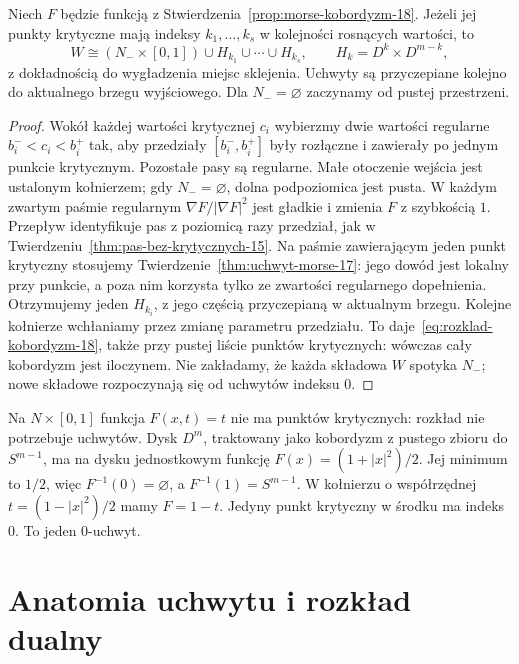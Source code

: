 \begin{twierdzenie}
\label{thm:rozklad-uchwyty-18}
Niech $F$ będzie funkcją z
Stwierdzenia~\ref{prop:morse-kobordyzm-18}.
Jeżeli jej punkty krytyczne mają indeksy
$k_1,\ldots,k_s$ w kolejności rosnących
wartości, to
\begin{equation}\label{eq:rozklad-kobordyzm-18}
 W\cong
 (N_-\times[0,1])\cup H_{k_1}\cup\cdots\cup H_{k_s},
 \qquad H_k=D^k\times D^{m-k},
\end{equation}
z dokładnością do wygładzenia miejsc sklejenia.
Uchwyty są przyczepiane kolejno do aktualnego
brzegu wyjściowego. Dla $N_-=\varnothing$
zaczynamy od pustej przestrzeni.
\end{twierdzenie}
\begin{proof}
Wokół każdej wartości krytycznej $c_i$ wybierzmy
dwie wartości regularne $b_i^-<c_i<b_i^+$ tak, aby
przedziały $[b_i^-,b_i^+]$ były rozłączne i zawierały
po jednym punkcie krytycznym. Pozostałe pasy są regularne.
Małe otoczenie wejścia jest ustalonym kołnierzem;
gdy $N_-=\varnothing$, dolna podpoziomica jest pusta.
W każdym zwartym paśmie regularnym
$\nabla F/|\nabla F|^2$ jest gładkie i zmienia $F$
z szybkością $1$. Przepływ identyfikuje pas
z poziomicą razy przedział, jak w
Twierdzeniu~\ref{thm:pas-bez-krytycznych-15}.
Na paśmie zawierającym jeden punkt krytyczny
stosujemy Twierdzenie~\ref{thm:uchwyt-morse-17}:
jego dowód jest lokalny przy punkcie, a poza nim
korzysta tylko ze zwartości regularnego dopełnienia.
Otrzymujemy jeden $H_{k_i}$, z jego częścią przyczepianą
w aktualnym brzegu. Kolejne kołnierze wchłaniamy
przez zmianę parametru przedziału.
To daje~\eqref{eq:rozklad-kobordyzm-18}, także przy
pustej liście punktów krytycznych: wówczas cały
kobordyzm jest iloczynem. Nie zakładamy, że każda
składowa $W$ spotyka $N_-$; nowe składowe rozpoczynają
się od uchwytów indeksu $0$.
\end{proof}

\begin{przyklad}
Na $N\times[0,1]$ funkcja $F(x,t)=t$
nie ma punktów krytycznych: rozkład nie
potrzebuje uchwytów. Dysk $D^m$, traktowany
jako kobordyzm z pustego zbioru do
$S^{m-1}$, ma na dysku jednostkowym funkcję
$F(x)=(1+|x|^2)/2$. Jej minimum to $1/2$,
więc $F^{-1}(0)=\varnothing$, a $F^{-1}(1)=S^{m-1}$.
W kołnierzu o współrzędnej $t=(1-|x|^2)/2$
mamy $F=1-t$. Jedyny punkt krytyczny w środku
ma indeks $0$.
To jeden $0$-uchwyt.
\end{przyklad}

\section{Anatomia uchwytu i rozkład dualny}
\label{sec:anatomia-uchwytu-18}

